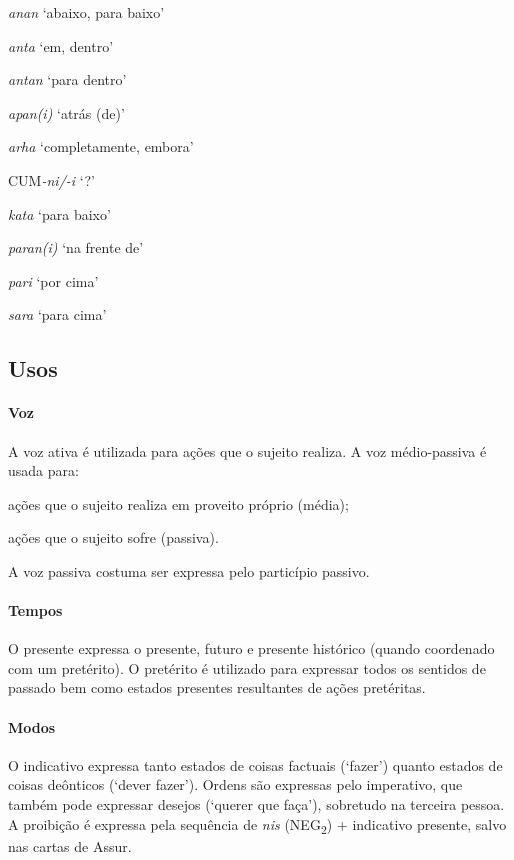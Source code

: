 \begin{multicols}{2}
	\begin{compactenum}[(a)]
		\item *\emph{anan} `abaixo, para baixo'
		\item \emph{anta} `em, dentro'
		\item \emph{antan} `para dentro'
		\item \emph{apan{(i)}} `atrás (de)'
		\item \emph{arha} `completamente, embora'
		\item CUM\emph{-ni/-i} `?'
		\item *\emph{kata} `para baixo'
		\item \emph{paran{(i)}} `na frente de'
		\item \emph{pari} `por cima'
		\item \emph{sara} `para cima'
	\end{compactenum}
\end{multicols}

\subsection{Usos}

\paragraph{Voz}
A voz ativa é utilizada para ações que o sujeito realiza.
A voz médio-passiva é usada para:
\begin{inparaenum}[(a)]
	\item ações que o sujeito realiza em proveito próprio (média);
	\item ações que o sujeito sofre (passiva).
\end{inparaenum}
A voz passiva costuma ser expressa pelo particípio passivo.


\paragraph{Tempos}
O presente expressa o presente, futuro e presente histórico (quando coordenado
com um pretérito).
O pretérito é utilizado para expressar todos os sentidos de passado bem como
estados presentes resultantes de ações pretéritas.


\paragraph{Modos}
O indicativo expressa tanto estados de coisas factuais (`fazer') quan\-to estados de coisas
deônticos (`dever fazer').
Ordens são expressas pelo imperativo, que também pode expressar desejos (`querer
que faça'), sobretudo na terceira pessoa.
A proibição é expressa pela sequência de \emph{nis} (NEG\textsubscript{2}) +
indicativo presente, salvo nas cartas de Assur.

